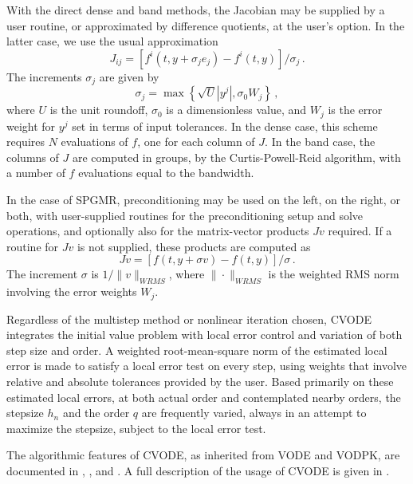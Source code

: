 With the direct dense and band methods, the Jacobian may be supplied
by a user routine, or approximated by difference quotients,
at the user's option.  In the latter case, we use the usual
approximation
\begin{equation*}
  J_{ij} = [f^i(t,y+\sigma_j e_j) - f^i(t,y)]/\sigma_j \, . 
\end{equation*}
The increments $\sigma_j$ are given by
\begin{equation*}
  \sigma_j = \max \left\{ \sqrt{U} |y^j| , \sigma_0 W_j \right\} \, ,
\end{equation*}
where $U$ is the unit roundoff, $\sigma_0$ is a dimensionless value,
and $W_j$ is the error weight for $y^j$ set in terms of input
tolerances.  In the dense case, this scheme requires $N$ evaluations
of $f$, one for each column of $J$.  In the band case, the columns
of $J$ are computed in groups, by the Curtis-Powell-Reid algorithm,
with a number of $f$ evaluations equal to the bandwidth.

In the case of SPGMR, preconditioning may be used on the left, on the
right, or both, with user-supplied routines for the preconditioning
setup and solve operations, and optionally also for the matrix-vector
products $Jv$ required.  If a routine for $Jv$ is not supplied, these
products are computed as
\begin{equation}\label{jacobv}
  Jv = [f(t,y+\sigma v) - f(t,y)]/\sigma \, . 
\end{equation}
The increment $\sigma$ is $1/\|v\|_{WRMS}$, where $\|\cdot\|_{WRMS}$
is the weighted RMS norm involving the error weights $W_j$.

Regardless of the multistep method or nonlinear iteration chosen,
CVODE integrates the initial value problem with local error control
and variation of both step size and order.  A weighted root-mean-square
norm of the estimated local error is made to satisfy a local error test on
every step, using weights that involve relative and absolute
tolerances provided by the user.  Based primarily on these estimated
local errors, at both actual order and contemplated nearby orders, the
stepsize $h_n$ and the order $q$ are frequently varied, always in an
attempt to maximize the stepsize, subject to the local error test.

The algorithmic features of CVODE, as inherited from VODE and
VODPK, are documented in \cite{BBH:89}, \cite{Byr:92}, and
\cite{Hin:00}. A full description of the usage of CVODE is given in
\cite{HiSe:03a}.

